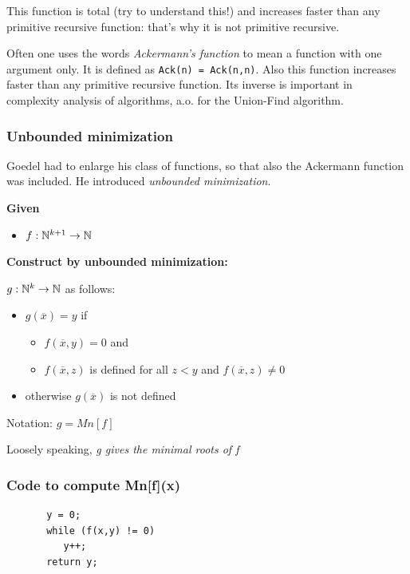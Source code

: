 This function is total (try to understand this!) and increases faster
than any primitive recursive function: that's why it is not primitive
recursive.

Often one uses the words {\em Ackermann's function} to mean a function
with one argument only. It is defined as
\verb|Ack(n) = Ack(n,n)|. Also this function increases faster than any
primitive recursive function. Its inverse is important in complexity
analysis of algorithms, a.o. for the Union-Find algorithm.



\subsubsection{Unbounded minimization}

Goedel had to enlarge his class of functions, so that also the
Ackermann function was included. He introduced {\em unbounded
  minimization}.

{\bf Given}
\begin{itemize}
\item $f: \mathbb{N}^{k+1} \rightarrow \mathbb{N}$
\end{itemize}

{\bf Construct by unbounded minimization:}

$g: \mathbb{N}^k \rightarrow \mathbb{N}$ as follows:

\begin{itemize}
\item[] $g(\overline{x}) = y$ if
\begin{itemize}
\item[] $f(\overline{x},y) = 0$ and
\item[] $f(\overline{x},z)$ is defined for all $z < y$ and
$f(\overline{x},z) \neq 0$
\end{itemize}
\item[] otherwise $g(\overline{x})$ is not defined
\end{itemize}


Notation: $g = Mn[f]$

Loosely speaking, 
{\em g gives the minimal roots of f}

\subsubsection{Code to compute Mn[f](x)}


\begin{verbatim}
       y = 0;
       while (f(x,y) != 0)
          y++;
       return y;
\end{verbatim}

